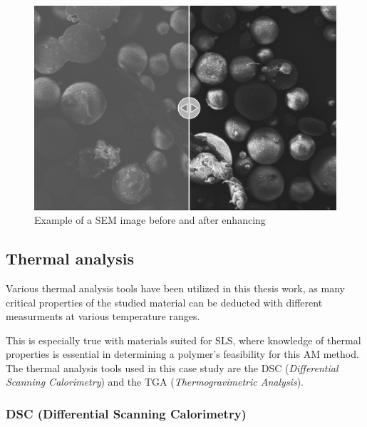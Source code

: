 \documentclass{article}
\begin{document}
                \begin{figure}[h!]
                    \centering
                    \includegraphics[width=\textwidth]{Pictures/SEM/Edited/unedited_vs_edited.png}
                    \caption{Example of a SEM image before and after enhancing \autocites{Inkscape}{Pixelmator_Pro}}
                    \label{fig:SEM_edited_vs_unedited}
                \end{figure}

            \clearpage

            \subsection{Thermal analysis\label{Thermal_analysis}}
    
            Various thermal analysis tools have been utilized in this thesis work, as many critical properties of the studied material 
            can be deducted with different measurments at various temperature ranges. 

            This is especially true with materials suited for SLS, where knowledge of thermal properties is 
            essential in determining a polymer's feasibility for this AM method. 
            The thermal analysis tools used in this case study are the DSC (\textit{Differential Scanning Calorimetry}) and the TGA
            (\textit{Thermogravimetric Analysis}). \\

            \subsubsection{DSC (Differential Scanning Calorimetry)\label{DSC_analysis}}
        
\end{document}
